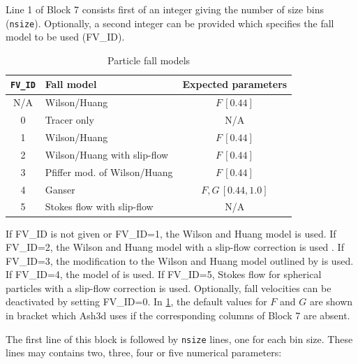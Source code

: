 Line 1 of Block 7 consists first of an integer giving the number of size bins
(\texttt{nsize}).
Optionally, a second integer can be provided which specifies the fall model to be used
(FV\_ID).
\begin{table}[htbp]
\begin{center}
\begin{tabular}{| c | l | c | }
\hline
\texttt{FV\_ID} & Fall model & Expected parameters\\
\hline
N/A & Wilson/Huang & $F \,[0.44]$ \\
0 &  Tracer only & N/A \\
1 &  Wilson/Huang & $F\, [0.44]$ \\
2 &  Wilson/Huang with slip-flow & $F\, [0.44]$ \\
3 &  Pfiffer mod. of Wilson/Huang & $F\, [0.44]$ \\
4 &  Ganser & $F,G \,[0.44,1.0]$ \\
5 &  Stokes flow with slip-flow & N/A \\
\hline
\end{tabular}
\caption{\label{tab:FallModelOpt}Particle fall models}
\end{center}
\end{table}

If FV\_ID is not given or FV\_ID=1, the Wilson and Huang \cite{Wilson79}
model is used.
If FV\_ID=2, the Wilson and Huang model with a slip-flow correction is used \cite{Seinfeld06}.
If FV\_ID=3, the modification to the Wilson and Huang model outlined
by \cite{Pfeiffer05} is used. If FV\_ID=4, the model of \cite{Ganser93} is used. If
FV\_ID=5, Stokes flow for spherical particles with a slip-flow correction is used.
Optionally, fall velocities can be deactivated by setting FV\_ID=0.  In \ref{tab:FallModelOpt},
the default values for $F$ and $G$ are shown in bracket which Ash3d uses if the corresponding
columns of Block 7 are absent.

The first line of this block is followed by \texttt{nsize} lines, one for each bin size.
These lines may contains two, three, four or five numerical parameters:

